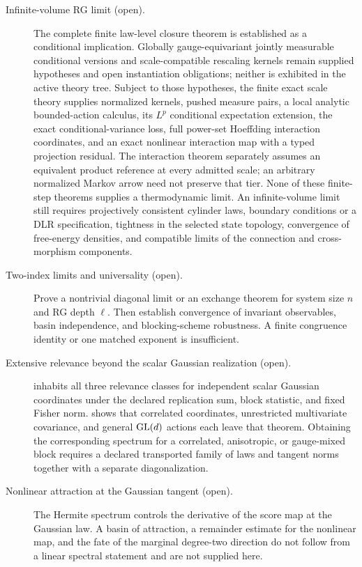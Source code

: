 \begin{description}
\item[Infinite-volume RG limit (open).]
The complete finite law-level closure theorem is established as a conditional
implication. Globally gauge-equivariant jointly measurable conditional versions
and scale-compatible rescaling kernels remain supplied hypotheses and open
instantiation obligations; neither is exhibited in the active theory tree.
Subject to those hypotheses, the finite exact scale theory supplies normalized
kernels, pushed measure
pairs, a local analytic bounded-action calculus, its \(L^p\) conditional
expectation extension, the exact conditional-variance loss, full
power-set Hoeffding interaction coordinates, and an exact nonlinear
interaction map with a typed projection residual.  The interaction theorem
separately assumes an equivalent product reference at every admitted scale;
an arbitrary normalized Markov arrow need not preserve that tier.  None of
these finite-step theorems supplies a thermodynamic limit.
An infinite-volume limit still requires projectively consistent cylinder laws,
boundary conditions or a DLR specification, tightness in the selected state
topology, convergence of free-energy densities, and compatible limits of the
connection and cross-morphism components. 

\item[Two-index limits and universality (open).]
Prove a nontrivial diagonal limit or an exchange theorem for system size
\(n\) and RG depth \(\ell\).  Then establish convergence of invariant
observables, basin independence, and blocking-scheme robustness.  A finite
congruence identity or one matched exponent is insufficient. 

\item[Extensive relevance beyond the scalar Gaussian realization (open).]
 inhabits all three relevance classes for
independent scalar Gaussian coordinates under the declared replication sum,
block statistic, and fixed Fisher norm.   shows that
correlated coordinates, unrestricted multivariate covariance, and general
\(\mathrm{GL}(d)\) actions each leave that theorem.  Obtaining the corresponding
spectrum for a correlated, anisotropic, or gauge-mixed block requires a declared
transported family of laws and tangent norms together with a separate
diagonalization. 

\item[Nonlinear attraction at the Gaussian tangent (open).]
The Hermite spectrum controls the derivative of the score map at the Gaussian
law.  A basin of attraction, a remainder estimate for the nonlinear map, and the
fate of the marginal degree-two direction do not follow from a linear spectral
statement and are not supplied here. 


\end{description}
